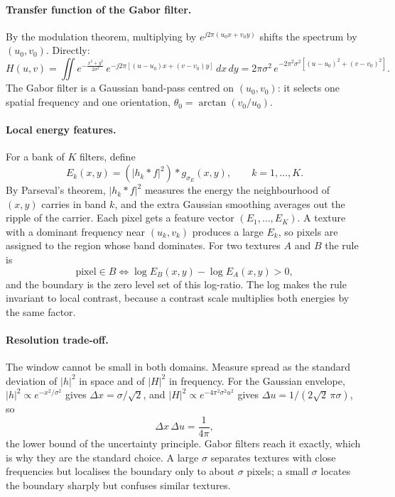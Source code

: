\documentclass[11pt]{article}
\begin{document}
\paragraph{Transfer function of the Gabor filter.} By the modulation theorem, multiplying by $e^{j2\pi(u_0x+v_0y)}$ shifts the spectrum by $(u_0,v_0)$. Directly:
\[
H(u,v)=\iint e^{-\frac{x^2+y^2}{2\sigma^2}}\,e^{-j2\pi[(u-u_0)x+(v-v_0)y]}\,dx\,dy
=2\pi\sigma^2\,e^{-2\pi^2\sigma^2\left[(u-u_0)^2+(v-v_0)^2\right]} .
\]
The Gabor filter is a Gaussian band-pass centred on $(u_0,v_0)$: it selects one spatial frequency and one orientation, $\theta_0=\arctan(v_0/u_0)$.

\paragraph{Local energy features.} For a bank of $K$ filters, define
\begin{equation}
E_k(x,y)=\left(|h_k*f|^2\right)*g_{\sigma_E}(x,y),\qquad k=1,\dots,K .
\end{equation}
By Parseval's theorem, $|h_k*f|^2$ measures the energy the neighbourhood of $(x,y)$ carries in band $k$, and the extra Gaussian smoothing averages out the ripple of the carrier. Each pixel gets a feature vector $(E_1,\dots,E_K)$. A texture with a dominant frequency near $(u_k,v_k)$ produces a large $E_k$, so pixels are assigned to the region whose band dominates. For two textures $A$ and $B$ the rule is
\begin{equation}
\text{pixel}\in B \iff \log E_B(x,y)-\log E_A(x,y)>0,
\end{equation}
and the boundary is the zero level set of this log-ratio. The log makes the rule invariant to local contrast, because a contrast scale multiplies both energies by the same factor.

\paragraph{Resolution trade-off.} The window cannot be small in both domains. Measure spread as the standard deviation of $|h|^2$ in space and of $|H|^2$ in frequency. For the Gaussian envelope, $|h|^2\propto e^{-x^2/\sigma^2}$ gives $\Delta x=\sigma/\sqrt2$, and $|H|^2\propto e^{-4\pi^2\sigma^2u^2}$ gives $\Delta u=1/(2\sqrt2\,\pi\sigma)$, so
\begin{equation}
\Delta x\,\Delta u=\frac{1}{4\pi},
\end{equation}
the lower bound of the uncertainty principle. Gabor filters reach it exactly, which is why they are the standard choice. A large $\sigma$ separates textures with close frequencies but localises the boundary only to about $\sigma$ pixels; a small $\sigma$ locates the boundary sharply but confuses similar textures.
\end{document}
